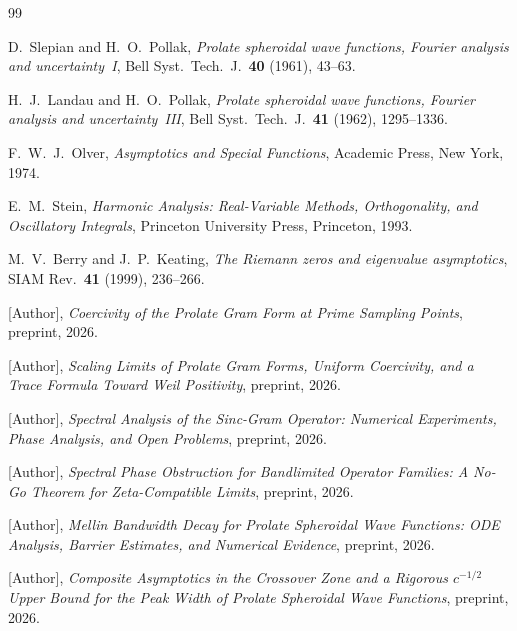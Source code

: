 \documentclass[12pt,a4paper]{amsart}
\theoremstyle{definition}
\theoremstyle{remark}
\begin{document}
\begin{thebibliography}{99}

D.~Slepian and H.~O.~Pollak,
\emph{Prolate spheroidal wave functions, Fourier analysis and uncertainty~I},
Bell Syst.\ Tech.\ J.\ \textbf{40} (1961), 43--63.

H.~J.~Landau and H.~O.~Pollak,
\emph{Prolate spheroidal wave functions, Fourier analysis and uncertainty~III},
Bell Syst.\ Tech.\ J.\ \textbf{41} (1962), 1295--1336.

F.~W.~J.~Olver,
\emph{Asymptotics and Special Functions},
Academic Press, New York, 1974.

E.~M.~Stein,
\textit{Harmonic Analysis: Real-Variable Methods,
Orthogonality, and Oscillatory Integrals},
Princeton University Press, Princeton, 1993.

M.~V.~Berry and J.~P.~Keating,
\emph{The Riemann zeros and eigenvalue asymptotics},
SIAM Rev.\ \textbf{41} (1999), 236--266.

[Author],
\textit{Coercivity of the Prolate Gram Form at Prime
Sampling Points}, preprint, 2026.

[Author],
\textit{Scaling Limits of Prolate Gram Forms, Uniform
Coercivity, and a Trace Formula Toward Weil
Positivity}, preprint, 2026.

[Author],
\textit{Spectral Analysis of the Sinc-Gram Operator:
Numerical Experiments, Phase Analysis, and Open
Problems}, preprint, 2026.

[Author],
\textit{Spectral Phase Obstruction for Bandlimited
Operator Families: A No-Go Theorem for
Zeta-Compatible Limits}, preprint, 2026.

[Author],
\textit{Mellin Bandwidth Decay for Prolate Spheroidal
Wave Functions: ODE Analysis, Barrier Estimates, and
Numerical Evidence}, preprint, 2026.

[Author],
\textit{Composite Asymptotics in the Crossover Zone
and a Rigorous $c^{-1/2}$ Upper Bound
for the Peak Width of Prolate Spheroidal
Wave Functions}, preprint, 2026.

\end{thebibliography}
\end{document}
